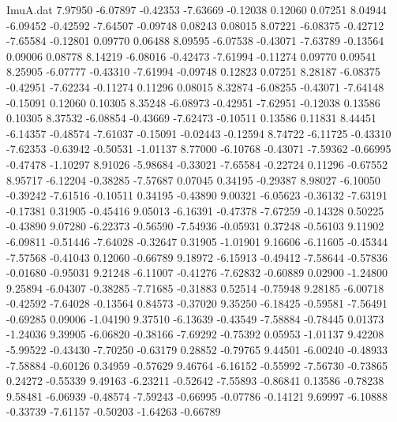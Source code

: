 \begin{filecontents}{ImuA.dat}
   7.97950   -6.07897   -0.42353   -7.63669   -0.12038    0.12060    0.07251
   8.04944   -6.09452   -0.42592   -7.64507   -0.09748    0.08243    0.08015
   8.07221   -6.08375   -0.42712   -7.65584   -0.12801    0.09770    0.06488
   8.09595   -6.07538   -0.43071   -7.63789   -0.13564    0.09006    0.08778
   8.14219   -6.08016   -0.42473   -7.61994   -0.11274    0.09770    0.09541
   8.25905   -6.07777   -0.43310   -7.61994   -0.09748    0.12823    0.07251
   8.28187   -6.08375   -0.42951   -7.62234   -0.11274    0.11296    0.08015
   8.32874   -6.08255   -0.43071   -7.64148   -0.15091    0.12060    0.10305
   8.35248   -6.08973   -0.42951   -7.62951   -0.12038    0.13586    0.10305
   8.37532   -6.08854   -0.43669   -7.62473   -0.10511    0.13586    0.11831
   8.44451   -6.14357   -0.48574   -7.61037   -0.15091   -0.02443   -0.12594
   8.74722   -6.11725   -0.43310   -7.62353   -0.63942   -0.50531   -1.01137
   8.77000   -6.10768   -0.43071   -7.59362   -0.66995   -0.47478   -1.10297
   8.91026   -5.98684   -0.33021   -7.65584   -0.22724    0.11296   -0.67552
   8.95717   -6.12204   -0.38285   -7.57687    0.07045    0.34195   -0.29387
   8.98027   -6.10050   -0.39242   -7.61516   -0.10511    0.34195   -0.43890
   9.00321   -6.05623   -0.36132   -7.63191   -0.17381    0.31905   -0.45416
   9.05013   -6.16391   -0.47378   -7.67259   -0.14328    0.50225   -0.43890
   9.07280   -6.22373   -0.56590   -7.54936   -0.05931    0.37248   -0.56103
   9.11902   -6.09811   -0.51446   -7.64028   -0.32647    0.31905   -1.01901
   9.16606   -6.11605   -0.45344   -7.57568   -0.41043    0.12060   -0.66789
   9.18972   -6.15913   -0.49412   -7.58644   -0.57836   -0.01680   -0.95031
   9.21248   -6.11007   -0.41276   -7.62832   -0.60889    0.02900   -1.24800
   9.25894   -6.04307   -0.38285   -7.71685   -0.31883    0.52514   -0.75948
   9.28185   -6.00718   -0.42592   -7.64028   -0.13564    0.84573   -0.37020
   9.35250   -6.18425   -0.59581   -7.56491   -0.69285    0.09006   -1.04190
   9.37510   -6.13639   -0.43549   -7.58884   -0.78445    0.01373   -1.24036
   9.39905   -6.06820   -0.38166   -7.69292   -0.75392    0.05953   -1.01137
   9.42208   -5.99522   -0.43430   -7.70250   -0.63179    0.28852   -0.79765
   9.44501   -6.00240   -0.48933   -7.58884   -0.60126    0.34959   -0.57629
   9.46764   -6.16152   -0.55992   -7.56730   -0.73865    0.24272   -0.55339
   9.49163   -6.23211   -0.52642   -7.55893   -0.86841    0.13586   -0.78238
   9.58481   -6.06939   -0.48574   -7.59243   -0.66995   -0.07786   -0.14121
   9.69997   -6.10888   -0.33739   -7.61157   -0.50203   -1.64263   -0.66789

\end{filecontents}
